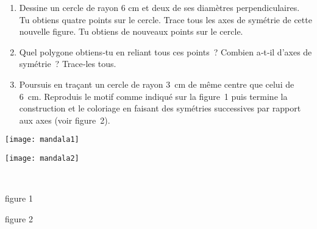 \begin{exercice}[Mandala]
\begin{enumerate}
 \item Dessine un cercle de rayon 6 cm et deux de ses diamètres perpendiculaires. Tu obtiens quatre points sur le cercle. Trace tous les axes de symétrie de cette nouvelle figure. Tu obtiens de nouveaux points sur le cercle.
 \item Quel polygone obtiens‑tu en reliant tous ces points ? Combien a‑t‑il d'axes de symétrie ? Trace‑les tous.
 \item Poursuis en traçant un cercle de rayon 3 cm de même centre que celui de 6 cm. Reproduis le motif comme indiqué sur la figure 1 puis termine la construction et le coloriage en faisant des symétries successives par rapport aux axes (voir figure 2).
 \end{enumerate}
 \begin{minipage}[c]{0.48\linewidth}
 \texttt{[image: mandala1]}
 \end{minipage} \hfill%
 \begin{minipage}[c]{0.48\linewidth}
 \texttt{[image: mandala2]} 
  \end{minipage} \\
\begin{minipage}[c]{0.48\linewidth}
\begin{center} figure 1 \end{center}
 \end{minipage} \hfill%
 \begin{minipage}[c]{0.48\linewidth}
\begin{center} figure 2 \end{center}
  \end{minipage} \\
\end{exercice}



